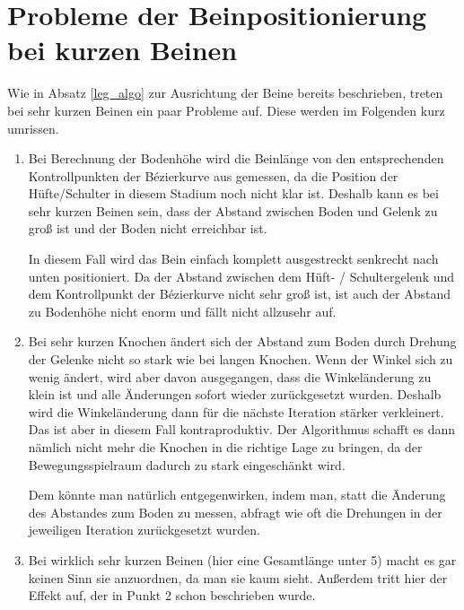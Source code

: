 \section{Probleme der Beinpositionierung bei kurzen Beinen}
\label{leg_positioning_short_legs}

Wie in Absatz \ref{leg_algo} zur Ausrichtung der Beine bereits beschrieben, treten bei sehr kurzen Beinen ein paar Probleme auf. Diese werden im Folgenden kurz umrissen.

\begin{enumerate}
 \item %
   Bei Berechnung der Bodenhöhe wird die Beinlänge von den entsprechenden Kontrollpunkten der Bézierkurve aus gemessen, da die Position der Hüfte/Schulter in diesem Stadium noch nicht klar ist. Deshalb kann es bei sehr kurzen Beinen sein, dass der Abstand zwischen Boden und Gelenk zu groß ist und der Boden nicht erreichbar ist.
   
   In diesem Fall wird das Bein einfach komplett ausgestreckt senkrecht nach unten positioniert. Da der Abstand zwischen dem Hüft- / Schultergelenk und dem Kontrollpunkt der Bézierkurve nicht sehr groß ist, ist auch der Abstand zu Bodenhöhe nicht enorm und fällt nicht allzusehr auf.
   
 \item %
   Bei sehr kurzen Knochen ändert sich der Abstand zum Boden durch Drehung der Gelenke nicht so stark wie bei langen Knochen. Wenn der Winkel sich zu wenig ändert, wird aber davon ausgegangen, dass die Winkeländerung zu klein ist und alle Änderungen sofort wieder zurückgesetzt wurden. Deshalb wird die Winkeländerung dann für die nächste Iteration stärker verkleinert. Das ist aber in diesem Fall kontraproduktiv. Der Algorithmus schafft es dann nämlich nicht mehr die Knochen in die richtige Lage zu bringen, da der Bewegungsspielraum dadurch zu stark eingeschänkt wird.
   
   Dem könnte man natürlich entgegenwirken, indem man, statt die Änderung des Abstandes zum Boden zu messen, abfragt wie oft die Drehungen in der jeweiligen Iteration zurückgesetzt wurden.
   
 \item %
   Bei wirklich sehr kurzen Beinen (hier eine Gesamtlänge unter 5) macht es gar keinen Sinn sie anzuordnen, da man sie kaum sieht. Außerdem tritt hier der Effekt auf, der in Punkt 2 schon beschrieben wurde.
   

\end{enumerate}
